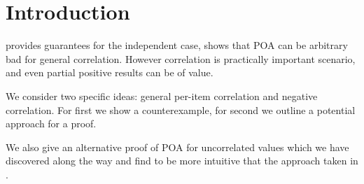 \section{Introduction}

\cite{survey} provides guarantees for the independent case, \cite{roughgarden} shows that POA can be arbitrary bad for general correlation. However correlation is practically important scenario, and even partial positive results can be of value.  

We consider two specific ideas: general per-item correlation and negative correlation. For first we show a counterexample, for second we outline a potential approach for a proof.

We also give an alternative proof of POA for uncorrelated values which we have discovered along the way and find to be more intuitive that the approach taken in \cite{survey}.